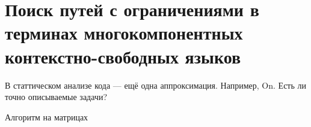 \chapter{Поиск путей с ограничениями в терминах многокомпонентных контекстно-свободных языков}

В статтическом анализе  кода --- ещё одна аппроксимация. Например, On. Есть ли точно описываемые задачи?

Алгоритм на матрицах